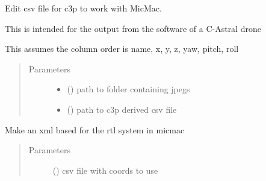 \documentclass[letterpaper,10pt,english]{sphinxmanual}
\begin{document}

\begin{fulllineitems}
\label{\detokenize{pycmac:utilities.convert_c3p}}
Edit csv file for c3p to work with MicMac.

This is intended for the output from the software of a C-Astral drone

This assumes the column order is name, x, y, z, yaw, pitch, roll
\begin{quote}\begin{description}
\item[{Parameters}] \leavevmode\begin{itemize}
\item {} 
 () \textendash{} path to folder containing jpegs

\item {} 
 () \textendash{} path to c3p derived csv file

\end{itemize}

\end{description}\end{quote}

\end{fulllineitems}


\begin{fulllineitems}
\label{\detokenize{pycmac:utilities.make_sys_utm}}
\end{fulllineitems}


\begin{fulllineitems}
\label{\detokenize{pycmac:utilities.make_xml}}
Make an xml based for the rtl system in micmac
\begin{quote}\begin{description}
\item[{Parameters}] \leavevmode
{} () \textendash{} csv file with coords to use

\end{description}\end{quote}

\end{fulllineitems}
\end{document}
